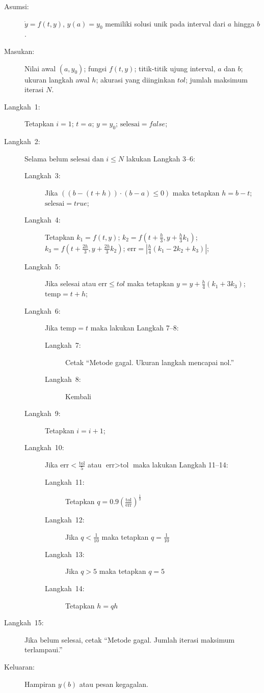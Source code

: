 \noindent\begin{pseudocode} 
\begin{description}
\item [{Asumsi:}] $\dot{y}=f(t,y)$, $y(a)=y_{0}$ memiliki solusi unik
pada interval dari $a$ hingga $b$.
\item [{Masukan:}] Nilai awal $(a,y_{0})$; fungsi $f(t,y)$; titik-titik
ujung interval, $a$ dan $b$; ukuran langkah awal $h$; akurasi yang
diinginkan $tol$; jumlah maksimum iterasi $N$.
\item [{Langkah~1:}] Tetapkan $i=1$; $t=a$; $y=y_{0}$; $\mbox{selesai}=false$;
\item [{Langkah~2:}] Selama $\mbox{belum selesai}\mbox{ dan }i\leq N$
lakukan Langkah 3--6:

\begin{description}
\item [{Langkah~3:}] Jika $((b-(t+h))\cdot(b-a)\leq0)$ maka tetapkan
$h=b-t$; $\mbox{selesai}=true$;
\item [{Langkah~4:}] Tetapkan $k_{1}=f(t,y)$; $k_{2}=f(t+\frac{h}{3},y+\frac{h}{3}k_{1})$;
$k_{3}=f(t+\frac{2h}{3},y+\frac{2h}{3}k_{2})$; $\mbox{err}=|\frac{h}{4}(k_{1}-2k_{2}+k_{3})|$;
\item [{Langkah~5:}] Jika selesai atau $\mbox{err}\leq tol$ maka tetapkan
$y=y+\frac{h}{4}(k_{1}+3k_{3})$; $\mbox{temp}=t+h$;
\item [{Langkah~6:}] Jika $\mbox{temp}=t$ maka lakukan Langkah 7--8:

\begin{description}
\item [{Langkah~7:}] Cetak ``Metode gagal. Ukuran langkah mencapai nol.''
\item [{Langkah~8:}] Kembali
\end{description}
\item [{Langkah~9:}] Tetapkan $i=i+1$;
\item [{Langkah~10:}] Jika $\mbox{err}<\frac{\mbox{tol}}{5}$ atau $\mbox{err}>\mbox{tol}$
maka lakukan Langkah 11--14:

\begin{description}
\item [{Langkah~11:}] Tetapkan $q=0.9\left(\frac{\mbox{tol}}{\mbox{err}}\right)^{\frac{1}{3}}$
\item [{Langkah~12:}] Jika $q<\frac{1}{10}$ maka tetapkan $q=\frac{1}{10}$
\item [{Langkah~13:}] Jika $q>5$ maka tetapkan $q=5$
\item [{Langkah~14:}] Tetapkan $h=qh$
\end{description}
\end{description}
\item [{Langkah~15:}] Jika belum selesai, cetak ``Metode gagal. Jumlah
iterasi maksimum terlampaui.''
\item [{Keluaran:}] Hampiran $y(b)$ atau pesan kegagalan.
\end{description}
\end{pseudocode}  

